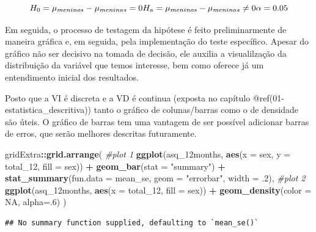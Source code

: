 \documentclass[
]{book}
\newenvironment{Shaded}{\begin{snugshade}}{\end{snugshade}}
\newcommand{\CommentTok}[1]{\textcolor[rgb]{0.56,0.35,0.01}{\textit{#1}}}
\newcommand{\DataTypeTok}[1]{\textcolor[rgb]{0.13,0.29,0.53}{#1}}
\newcommand{\DecValTok}[1]{\textcolor[rgb]{0.00,0.00,0.81}{#1}}
\newcommand{\FloatTok}[1]{\textcolor[rgb]{0.00,0.00,0.81}{#1}}
\newcommand{\KeywordTok}[1]{\textcolor[rgb]{0.13,0.29,0.53}{\textbf{#1}}}
\newcommand{\NormalTok}[1]{#1}
\newcommand{\OperatorTok}[1]{\textcolor[rgb]{0.81,0.36,0.00}{\textbf{#1}}}
\newcommand{\OtherTok}[1]{\textcolor[rgb]{0.56,0.35,0.01}{#1}}
\newcommand{\StringTok}[1]{\textcolor[rgb]{0.31,0.60,0.02}{#1}}
\begin{document}
\[H_0 = \mu_{meninos} - \mu_{meninas} = 0 \\ H_a = \mu_{meninos} - \mu_{meninas} \neq 0 \\ \alpha = 0.05\]

Em seguida, o processo de testagem da hipótese é feito preliminarmente de maneira gráfica e, em seguida, pela implementação do teste específico. Apesar do gráfico não ser decisivo na tomada de decisão, ele auxilia a visualilzação da distribuição da variável que temos interesse, bem como oferece já um entendimento inicial dos resultados.

Posto que a VI é discreta e a VD é continua (exposta no capítulo @ref(01-estatistica\_descritiva)) tanto o gráfico de colunas/barras como o de densidade são úteis. O gráfico de barras tem uma vantagem de ser possível adicionar barras de erros, que serão melhores descritas futuramente.

\begin{Shaded}
\begin{Highlighting}[]
\NormalTok{gridExtra}\OperatorTok{::}\KeywordTok{grid.arrange}\NormalTok{(}
  \CommentTok{#plot 1 }
  \KeywordTok{ggplot}\NormalTok{(asq_12months, }\KeywordTok{aes}\NormalTok{(}\DataTypeTok{x =}\NormalTok{ sex, }\DataTypeTok{y =}\NormalTok{ total_}\DecValTok{12}\NormalTok{, }\DataTypeTok{fill =}\NormalTok{ sex)) }\OperatorTok{+}
\StringTok{    }\KeywordTok{geom_bar}\NormalTok{(}\DataTypeTok{stat =} \StringTok{"summary"}\NormalTok{) }\OperatorTok{+}
\StringTok{    }\KeywordTok{stat_summary}\NormalTok{(}\DataTypeTok{fun.data =}\NormalTok{ mean_se, }\DataTypeTok{geom =} \StringTok{"errorbar"}\NormalTok{, }\DataTypeTok{width =} \FloatTok{.2}\NormalTok{),}
  \CommentTok{#plot 2}
    \KeywordTok{ggplot}\NormalTok{(asq_12months, }\KeywordTok{aes}\NormalTok{(}\DataTypeTok{x =}\NormalTok{ total_}\DecValTok{12}\NormalTok{, }\DataTypeTok{fill =}\NormalTok{ sex)) }\OperatorTok{+}\StringTok{ }
\StringTok{    }\KeywordTok{geom_density}\NormalTok{(}\DataTypeTok{color =} \OtherTok{NA}\NormalTok{, }\DataTypeTok{alpha=}\NormalTok{.}\DecValTok{6}\NormalTok{)}
\NormalTok{)}
\end{Highlighting}
\end{Shaded}

\begin{verbatim}
## No summary function supplied, defaulting to `mean_se()`
\end{verbatim}
\end{document}
